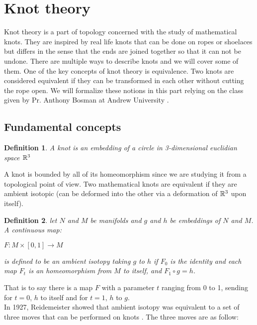\documentclass[12pt, a4paper]{article}
\newtheorem{definition}{Definition}
\begin{document}
\section{Knot theory}

Knot theory is a part of topology concerned with the study of mathematical knots. They are inspired by real life knots  that can be done on ropes or shoelaces but differs in the sense that the ends are joined together so that it can not be undone. There are multiple ways to describe knots and we will cover some of them. One of the key concepts of knot theory is equivalence. Two knots are considered equivalent if they can be transformed in each other without cutting the rope open. We will formalize these notions in this part relying on the class given by Pr. Anthony Bosman at Andrew University \cite{anthony_bosman_knot_2019}.

\subsection{Fundamental concepts}

\begin{definition}
  A knot is an embedding of a circle in 3-dimensional euclidian space $\mathbb{R}^3$
\end{definition}

A knot is bounded by all of its homeomorphism since we are studying it from a topological point of view. Two mathematical knots are equivalent if they are ambient isotopic (can be deformed into the other via a deformation of $\mathbb{R}^3$ upon itself).\\

\begin{definition}
  let $N$ and $M$ be manifolds and $g$ and $h$ be embeddings of $N$ and $M$. A continuous map:
   \begin{center}
     $F: M \times [0,1] \to M$
   \end{center}
  is defined to be an ambient isotopy taking $g$ to $h$ if $F_0$ is the identity and each map $F_t$ is an homeomorphism from $M$ to itself, and $F_1 \circ g = h$.
\end{definition}

That is to say there is a map $F$ with a parameter $t$ ranging from 0 to 1, sending for $t=0$, $h$ to itself and for $t = 1$, $h$ to $g$.\\

In 1927, Reidemeister showed that ambient isotopy was equivalent to a set of three moves that can be performed on knots \cite{reidemeister_elementare_1927}. The three moves are as follow:
\end{document}

